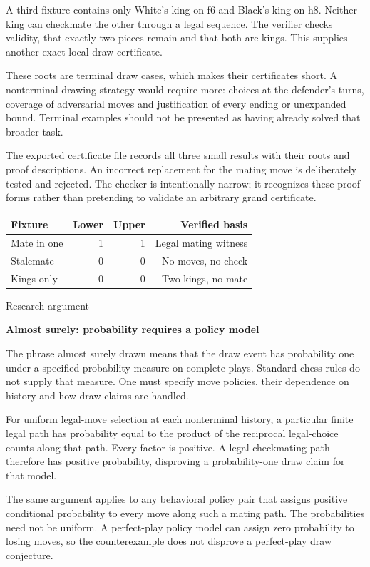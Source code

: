 \documentclass[10pt]{article}
\begin{document}
A third fixture contains only White's king on f6 and Black's king on h8. Neither king can checkmate the other through a legal sequence. The verifier checks validity, that exactly two pieces remain and that both are kings. This supplies another exact local draw certificate.\par
These roots are terminal draw cases, which makes their certificates short. A nonterminal drawing strategy would require more: choices at the defender's turns, coverage of adversarial moves and justification of every ending or unexpanded bound. Terminal examples should not be presented as having already solved that broader task.\par
The exported certificate file records all three small results with their roots and proof descriptions. An incorrect replacement for the mating move is deliberately tested and rejected. The checker is intentionally narrow; it recognizes these proof forms rather than pretending to validate an arbitrary grand certificate.\par
{\small\begin{tabularx}{\linewidth}{Xrrr}\toprule
Fixture & Lower & Upper & Verified basis\\\midrule
Mate in one & 1 & 1 & Legal mating witness\\
Stalemate & 0 & 0 & No moves, no check\\
Kings only & 0 & 0 & Two kings, no mate\\
\bottomrule\end{tabularx}}\par
\clearpage
{\small\color{accent}Research argument}\par
{\LARGE\bfseries\color{ink}Almost surely: probability requires a policy model}\par\vspace{7pt}
The phrase almost surely drawn means that the draw event has probability one under a specified probability measure on complete plays. Standard chess rules do not supply that measure. One must specify move policies, their dependence on history and how draw claims are handled.\par
For uniform legal-move selection at each nonterminal history, a particular finite legal path has probability equal to the product of the reciprocal legal-choice counts along that path. Every factor is positive. A legal checkmating path therefore has positive probability, disproving a probability-one draw claim for that model.\par
The same argument applies to any behavioral policy pair that assigns positive conditional probability to every move along such a mating path. The probabilities need not be uniform. A perfect-play policy model can assign zero probability to losing moves, so the counterexample does not disprove a perfect-play draw conjecture.\par
\end{document}
